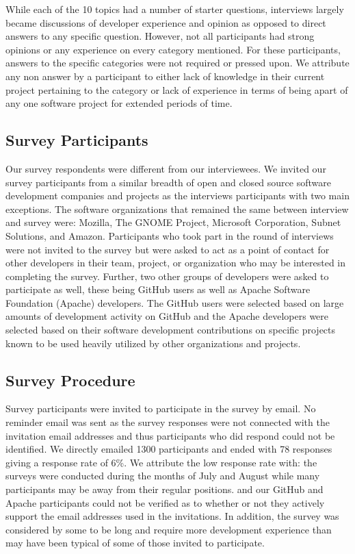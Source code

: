 \documentclass[conference]{IEEEtran}
\newcommand{\totalCategories}{10}
\begin{document}
While each of the \totalCategories{} topics had a number of starter questions, interviews 
largely became discussions of developer experience and opinion as opposed to direct answers to any specific question.
However, not all participants had strong opinions or any experience on every category mentioned. For these participants, answers 
to the specific categories were not required or pressed upon. We attribute any non answer by a participant to
either lack of knowledge in their current project pertaining to the category or lack of experience in terms of
being apart of any one software project for extended periods of time. 


\subsection{Survey Participants}

Our survey respondents were different from our interviewees. We invited our survey participants from a similar breadth of open and closed source software development 
companies and projects as the interviews participants with two main exceptions. The software organizations
that remained the same between interview and survey were: Mozilla, The GNOME Project, Microsoft Corporation, 
Subnet Solutions, and Amazon.
Participants who took part in the round of interviews were not invited to the survey but were asked to act as a  point of contact for other 
developers in their team, project, or organization who may be interested
in completing the survey. Further, two other groups of developers were asked to
participate as well, these being GitHub users as well as Apache Software Foundation (Apache) developers. The GitHub
users were selected based on large amounts of development activity on GitHub and the Apache developers
were selected based on their software development contributions on specific projects known to be used heavily
utilized by other organizations and projects.

\subsection{Survey Procedure}

Survey participants were invited to participate in the survey by email. No reminder email was sent as the
survey responses were not connected with the invitation email addresses and thus participants who did respond
could not be identified. We directly emailed 1300 participants and ended with 78 responses
giving a response rate of 6\%. We attribute the low response rate with: the surveys
were conducted during the months of July and August while many participants may be away from their regular positions.
and our GitHub and Apache participants could not be verified as to whether or not they actively support the
email addresses used in the invitations. In addition, the survey was considered by some to be long and require
more development experience than may have been typical of some of those invited to participate.
\end{document}
